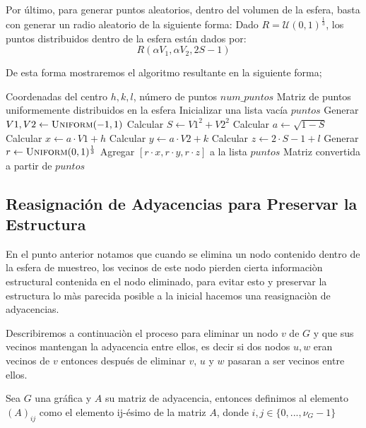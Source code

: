 Por último, para generar puntos aleatorios, dentro del volumen de la esfera, basta con generar un radio aleatorio de la siguiente forma: 
Dado $ R = \mathcal{U}(0,1)^\frac{1}{3}$, los puntos distribuidos dentro de la esfera están dados por:
\[
R(\alpha V_1, \alpha V_2, 2S-1)
\]

De esta forma mostraremos el algoritmo resultante en la siguiente forma;
\begin{algorithm}[H]
\caption{Generar Puntos Uniformes en una Esfera}
\label{alg:generaPuntos}
\begin{algorithmic}[1]
\Require Coordenadas del centro $h, k, l$, número de puntos $num\_puntos$
\Ensure Matriz de puntos uniformemente distribuidos en la esfera
\Statex
{}
    \State Inicializar una lista vacía $puntos$
        \Repeat
            \State Generar $V1, V2 \gets \textsc{Uniform}(-1, 1)$
            \State Calcular $S \gets V1^2 + V2^2$
        \State Calcular $a \gets \sqrt{1 - S}$
        \State Calcular $x \gets a \cdot V1 + h$
        \State Calcular $y \gets a \cdot V2 + k$
        \State Calcular $z \gets 2 \cdot S - 1 + l$
        \State Generar $r \gets \textsc{Uniform}(0, 1)^{\frac{1}{3}}$
        \State Agregar $[r \cdot x, r \cdot y, r \cdot z]$ a la lista $puntos$
    \EndFor
    \State \Return Matriz convertida a partir de $puntos$
\EndFunction
\end{algorithmic}
\end{algorithm}

\subsection{Reasignación de Adyacencias para Preservar la Estructura}

En el punto anterior notamos que cuando se elimina un nodo contenido dentro de la esfera de muestreo, los vecinos de este nodo pierden cierta informaciòn estructural contenida en el nodo eliminado, para evitar esto y preservar la estructura lo màs parecida posible a la inicial hacemos una reasignaciòn de adyacencias.

Describiremos a continuaciòn el proceso para eliminar un nodo $v$ de $G$ y que sus vecinos mantengan la adyacencia entre ellos, es decir si dos nodos $u,w$ eran vecinos de $v$ entonces después de eliminar $v$, $u$ y $w$ pasaran a ser vecinos entre ellos.

\begin{definition}
    Sea $G$ una gráfica y $A$ su matriz de adyacencia, entonces definimos al elemento $(A)_{ij}$ como el elemento ij-ésimo de la matriz $A$, donde $i,j \in \{0,...,\nu_G -1\}$
\end{definition}

